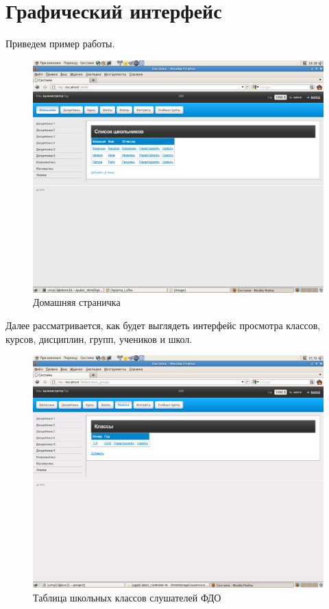 \section{Графический интерфейс}
Приведем пример работы.\\
\begin{figure}[h!]
\begin{center}
\includegraphics[scale=0.35]{image/main.png}
\end{center}
\newpage
\caption{Домашняя страничка}
\end{figure}
\newpage
Далее рассматривается, как будет выглядеть интерфейс просмотра классов, курсов, дисциплин, групп, учеников и школ.\\
\begin{figure}
\begin{center}
\includegraphics[scale=0.25]{image/classes.png}
\caption{Таблица школьных классов слушателей ФДО}
\end{center}
\end{figure}

